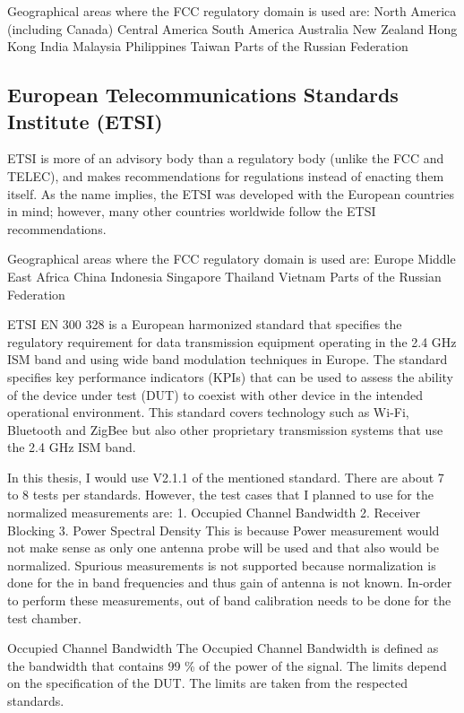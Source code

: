 Geographical areas where the FCC regulatory domain is used are:
North America (including Canada)
Central America
South America
Australia
New Zealand
Hong Kong
India
Malaysia
Philippines
Taiwan
Parts of the Russian Federation

\subsection{European Telecommunications Standards Institute (ETSI)}
ETSI is more of an advisory body than a regulatory body (unlike the FCC and TELEC), and makes recommendations for regulations instead of enacting them itself. As the name implies, the ETSI was developed with the European countries in mind; however, many other countries worldwide follow the ETSI recommendations.

Geographical areas where the FCC regulatory domain is used are:
Europe
Middle East
Africa
China
Indonesia
Singapore
Thailand
Vietnam
Parts of the Russian Federation

ETSI EN 300 328 is a European harmonized standard that specifies the regulatory requirement for data transmission equipment operating in the 2.4 GHz ISM band and using wide band modulation techniques in Europe. The standard specifies key performance indicators (KPIs) that can be used to assess the ability of the device under test (DUT) to coexist with other device in the intended operational environment. This standard covers technology such as Wi-Fi, Bluetooth and ZigBee but also other proprietary transmission systems that use the 2.4 GHz ISM band. 

In this thesis, I would use V2.1.1 of the mentioned standard. There are about 7 to 8 tests per standards. However, the test cases that I planned to use for the normalized measurements are:
1.	Occupied Channel Bandwidth
2.	Receiver Blocking
3.	Power Spectral Density
This is because Power measurement would not make sense as only one antenna probe will be used and that also would be normalized. Spurious measurements is not supported because normalization is done for the in band frequencies and thus gain of antenna is not known. In-order to perform these measurements, out of band calibration needs to be done for the test chamber. 

Occupied Channel Bandwidth
The Occupied Channel Bandwidth is defined as the bandwidth that contains 99 \% of the power of the signal. The limits depend on the specification of the DUT. The limits are taken from the respected standards.

